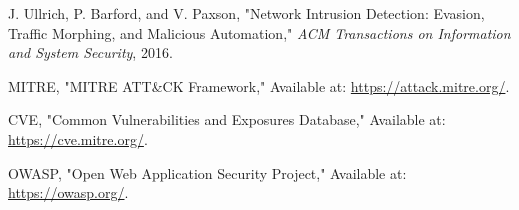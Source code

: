 \documentclass[conference]{IEEEtran}
\begin{document}
\begin{thebibliography}{9}
J. Ullrich, P. Barford, and V. Paxson, "Network Intrusion Detection: Evasion, Traffic Morphing, and Malicious Automation," \textit{ACM Transactions on Information and System Security}, 2016.

MITRE, "MITRE ATT\&CK Framework," Available at: \url{https://attack.mitre.org/}.

CVE, "Common Vulnerabilities and Exposures Database," Available at: \url{https://cve.mitre.org/}.

OWASP, "Open Web Application Security Project," Available at: \url{https://owasp.org/}.

    
\end{thebibliography}
\end{document}
